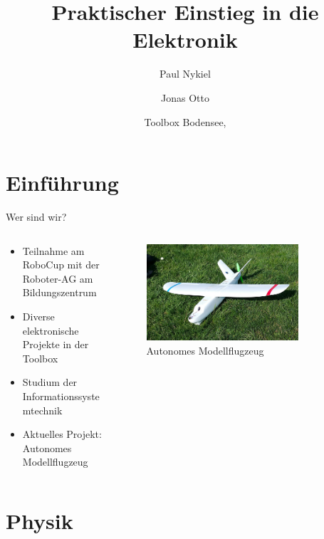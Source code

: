 \documentclass[aspectratio=169]{beamer}
\title{Praktischer Einstieg in die Elektronik}
\author{Paul Nykiel \and Jonas Otto}
\institute[Toolbox Bodensee]
\date{Toolbox Bodensee, \the\year}
\begin{document}
\begin{frame}
  \titlepage
\end{frame}

\section{Einführung} 
\begin{frame}{Wer sind wir?}
    \begin{columns}
        \begin{column}{0.5\textwidth}
            \begin{itemize}
                \item Teilnahme am RoboCup mit der Roboter-AG am Bildungszentrum
                \item Diverse elektronische Projekte in der Toolbox
                \item Studium der Informationssystemtechnik
                \item Aktuelles Projekt: Autonomes Modellflugzeug
            \end{itemize}
        \end{column}
        \begin{column}{0.5\textwidth}
            \begin{figure}
                \centering
                \includegraphics[width=0.8\textwidth]{20170329_155837.jpg}
                \caption{Autonomes Modellflugzeug}
            \end{figure} 
        \end{column}
    \end{columns}
\end{frame}

\section{Physik}
\end{document}
